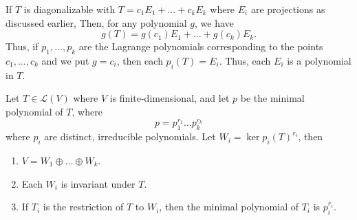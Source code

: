 \documentclass[11pt]{article}
\newcommand{\alg}[1]{\mathscr{#1}}
\newcommand{\algL}{\alg{L}}
\renewcommand{\ker}{\operatorname{ker}}
\theoremstyle{definition}
\theoremstyle{remark}
\numberwithin{equation}{section}
\begin{document}
    \begin{lemma}
        If $T$ is diagonalizable with $T = c_1E_1 + \dots + c_kE_k$ where $E_i$ are
        projections as discussed earlier, Then, for any polynomial $g$, we have \[
            g(T) = g(c_1)E_1 + \dots + g(c_k)E_k.
        \] Thus, if $p_1, \dots, p_k$ are the Lagrange polynomials corresponding to
        the points $c_1, \dots, c_k$ and we put $g = c_i$, then each $p_i(T) = E_i$.
        Thus, each $E_i$ is a polynomial in $T$.
    \end{lemma}

    \begin{theorem}
        Let $T \in \algL(V)$ where $V$ is finite-dimensional, and let $p$ be the
        minimal polynomial of $T$, where \[
            p = p_1^{r_1} \dots p_k^{r_k}
        \] where $p_i$ are distinct, irreducible polynomials. Let $W_i =
        \ker{p_i(T)^{r_i}}$, then 
        \begin{enumerate}
            \itemsep0em
            \item $V = W_1 \oplus \dots \oplus W_k$.
            \item Each $W_i$ is invariant under $T$.
            \item If $T_i$ is the restriction of $T$ to $W_i$, then the minimal
            polynomial of $T_i$ is $p_i^{r_i}$.
        \end{enumerate}
    \end{theorem}
\end{document}
